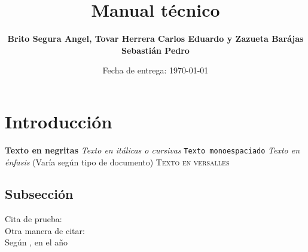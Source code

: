 \documentclass[letterpaper,10.5pt]{article} %
\title{Manual técnico}
\author{\textbf{Brito Segura Angel, Tovar Herrera Carlos Eduardo y Zazueta Barájas Sebastián Pedro}}
\date{Fecha de entrega: \today}
\begin{document}
    \pagestyle{fancy} %
    \maketitle %
    
    \section{Introducción}
	    \textbf{Texto en negritas} \newline
		\textit{Texto en itálicas o cursivas} \newline
		\texttt{Texto monoespaciado} \newline
		\emph{Texto en énfasis} (Varía según tipo de documento) \newline
		\textsc{Texto en versalles} \newline

    \subsection{Subsección}
	    Cita de prueba: \cite{kim1995novel}\\ %

		Otra manera de citar: \citet{ipsum2010lorem}\\ %

		Según \citeauthor{ipsum2010lorem}, %
		en el año \citeyear{ipsum2010lorem}\\ %

	\hfill \break %

	
    
\end{document}
